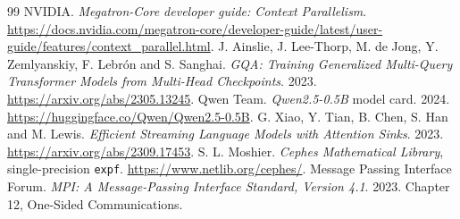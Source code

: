 \documentclass[10pt,a4paper]{article}
\newcommand{\code}[1]{\texttt{#1}}
\begin{document}
\begin{thebibliography}{99}
 NVIDIA. \emph{Megatron-Core developer guide: Context
Parallelism}. \url{https://docs.nvidia.com/megatron-core/developer-guide/latest/user-guide/features/context_parallel.html}.
 J. Ainslie, J. Lee-Thorp, M. de Jong, Y. Zemlyanskiy, F. Lebr\'on and
S. Sanghai. \emph{GQA: Training Generalized Multi-Query Transformer Models from
Multi-Head Checkpoints}. 2023. \url{https://arxiv.org/abs/2305.13245}.
 Qwen Team. \emph{Qwen2.5-0.5B} model card. 2024.
\url{https://huggingface.co/Qwen/Qwen2.5-0.5B}.
 G. Xiao, Y. Tian, B. Chen, S. Han and M. Lewis. \emph{Efficient
Streaming Language Models with Attention Sinks}. 2023. \url{https://arxiv.org/abs/2309.17453}.
 S. L. Moshier. \emph{Cephes Mathematical Library}, single-precision
\code{expf}. \url{https://www.netlib.org/cephes/}.
 Message Passing Interface Forum. \emph{MPI: A Message-Passing Interface
Standard, Version 4.1}. 2023. Chapter 12, One-Sided Communications.
\end{thebibliography}

\appendix

\end{document}

